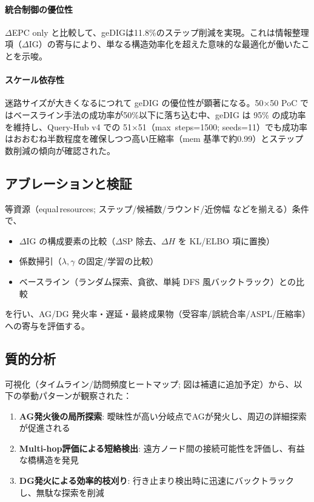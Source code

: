 \documentclass[ja=standard,xelatex]{bxjsarticle}
\begin{document}
\paragraph{統合制御の優位性}
$\Delta$EPC only と比較して、geDIGは11.8\%のステップ削減を実現。これは情報整理項（$\Delta$IG）の寄与により、単なる構造効率化を超えた意味的な最適化が働いたことを示唆。

\paragraph{スケール依存性}
迷路サイズが大きくなるにつれて geDIG の優位性が顕著になる。50×50 PoC ではベースライン手法の成功率が50\%以下に落ち込む中、geDIG は 95\% の成功率を維持し、Query-Hub v4 での 51×51（max~steps=1500; seeds=11）でも成功率はおおむね半数程度を確保しつつ高い圧縮率（mem 基準で約0.99）とステップ数削減の傾向が確認された。

\subsection{アブレーションと検証}
\label{sec:maze_ablation}
等資源（equal\,resources; ステップ/候補数/ラウンド/近傍幅 などを揃える）条件で、
\begin{itemize}
  \item $\Delta\mathrm{IG}$ の構成要素の比較（$\Delta\mathrm{SP}$ 除去、$\Delta H$ を KL/ELBO 項に置換）
  \item 係数掃引（$\lambda,\gamma$ の固定/学習の比較）
  \item ベースライン（ランダム探索、貪欲、単純 DFS 風バックトラック）との比較
\end{itemize}
を行い、AG/DG 発火率・遅延・最終成果物（受容率/誤統合率/ASPL/圧縮率）への寄与を評価する。

\subsection{質的分析}

可視化（タイムライン/訪問頻度ヒートマップ; 図は補遺に追加予定）から、以下の挙動パターンが観察された：
\begin{enumerate}
  \item \textbf{AG発火後の局所探索}: 曖昧性が高い分岐点でAGが発火し、周辺の詳細探索が促進される
  \item \textbf{Multi-hop評価による短絡検出}: 遠方ノード間の接続可能性を評価し、有益な橋構造を発見
  \item \textbf{DG発火による効率的枝刈り}: 行き止まり検出時に迅速にバックトラックし、無駄な探索を削減
\end{enumerate}
\end{document}
